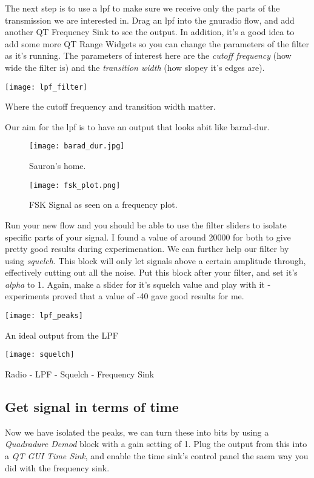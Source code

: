 The next step is to use a \gls{lpf} to make sure we receive only the parts of the transmission we are interested in. Drag an \gls{lpf} into the gnuradio flow, and add another QT Frequency Sink to see the output. In addition, it's a good idea to add some more QT Range Widgets so you can change the parameters of the filter as it's running. The parameters of interest here are the \textit{cutoff frequency} (how wide the filter is) and the \textit{transition width} (how slopey it's edges are). 

\centrefigurestart
\texttt{[image: lpf\_filter]}
\caption{Where the cutoff frequency and transition width matter.}
\centrefigureend

Our aim for the \gls{lpf} is to have an output that looks abit like barad-dur.

\begin{figure}[H]
    \centering
    \begin{minipage}{0.45\textwidth}
        \centering
        \texttt{[image: barad\_dur.jpg]} 
        \caption{Sauron's home.}
    \end{minipage}\hfill
    \begin{minipage}{0.45\textwidth}
        \centering
        \texttt{[image: fsk\_plot.png]}
        \caption{FSK Signal as seen on a frequency plot.}
    \end{minipage}
\end{figure}

Run your new flow and you should be able to use the filter sliders to isolate specific parts of your signal. I found a value of around 20000 for both to give pretty good results during experimenation. We can further help our filter by using \textit{squelch}. This block will only let signals above a certain amplitude through, effectively cutting out all the noise. Put this block after your filter, and set it's \textit{alpha} to 1. Again, make a slider for it's squelch value and play with it - experiments proved that a value of -40 gave good results for me.

\centrefigurestart
\texttt{[image: lpf\_peaks]}
\caption{An ideal output from the LPF}
\centrefigureend


\centrefigurestart
\texttt{[image: squelch]}
\caption{Radio - LPF - Squelch - Frequency Sink}
\centrefigureend

\subsection{Get signal in terms of time}
Now we have isolated the peaks, we can turn these into bits by using a \textit{Quadradure Demod} block with a gain setting of 1. Plug the output from this into a \textit{QT GUI Time Sink}, and enable the time sink's control panel the saem way you did with the frequency sink. 


